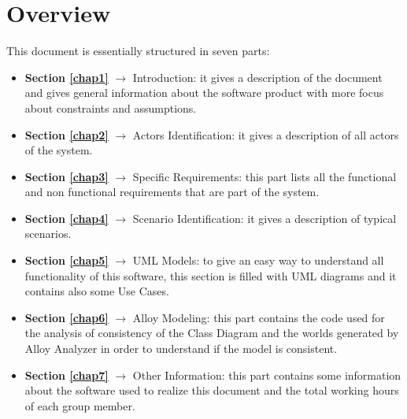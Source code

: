 \section{Overview}
This document is essentially structured in seven parts:
\begin{itemize}
	\item \textbf{Section \ref{chap1}} $\rightarrow$ Introduction: it gives a description of the document and gives general information about the software product with more focus about constraints and assumptions.
	\item \textbf{Section \ref{chap2}} $\rightarrow$ Actors Identification: it gives a description of all actors of the system.
	\item \textbf{Section \ref{chap3}} $\rightarrow$ Specific Requirements: this part lists all the functional and non functional requirements that are part of the system.
	\item \textbf{Section \ref{chap4}} $\rightarrow$ Scenario Identification: it gives a description of typical scenarios.
	\item \textbf{Section \ref{chap5}} $\rightarrow$ UML Models: to give an easy way to understand all functionality of this software, this section is filled with UML diagrams and it contains also some Use Cases.
	\item \textbf{Section \ref{chap6}} $\rightarrow$ Alloy Modeling: this part contains the code used for the analysis of consistency of the Class Diagram and the worlds generated by Alloy Analyzer in order to understand if the model is consistent.
	\item \textbf{Section \ref{chap7}} $\rightarrow$ Other Information: this part contains some information about the software used to realize this document and the total working hours of each group member.
\end{itemize}